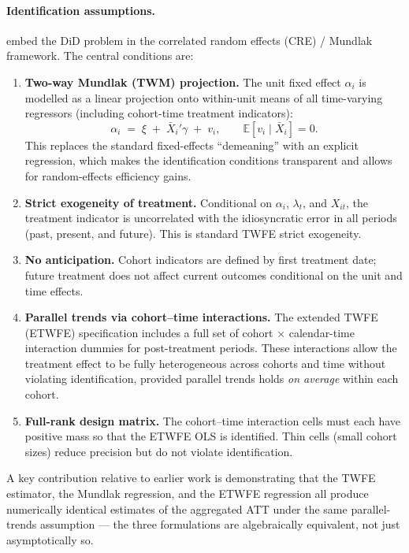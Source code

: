 \documentclass[12pt]{article}
\begin{document}
\paragraph{Identification assumptions.}
\citet{wooldridge2025twoway} embed the DiD problem in the correlated random
effects (CRE) / Mundlak framework.
The central conditions are:
\begin{enumerate}
  \item \textbf{Two-way Mundlak (TWM) projection.}
        The unit fixed effect $\alpha_i$ is modelled as a linear projection
        onto within-unit means of all time-varying regressors
        (including cohort-time treatment indicators):
        \[
          \alpha_i \;=\; \xi \;+\; \bar{X}_i'\gamma \;+\; v_i,
          \qquad \mathbb{E}[v_i \mid \bar{X}_i] = 0.
        \]
        This replaces the standard fixed-effects ``demeaning'' with an
        explicit regression, which makes the identification conditions
        transparent and allows for random-effects efficiency gains.

  \item \textbf{Strict exogeneity of treatment.}
        Conditional on $\alpha_i$, $\lambda_t$, and $X_{it}$, the treatment
        indicator is uncorrelated with the idiosyncratic error in all periods
        (past, present, and future).
        This is standard TWFE strict exogeneity.

  \item \textbf{No anticipation.}
        Cohort indicators are defined by first treatment date; future treatment
        does not affect current outcomes conditional on the unit and time effects.

  \item \textbf{Parallel trends via cohort--time interactions.}
        The extended TWFE (ETWFE) specification includes a full set of
        cohort $\times$ calendar-time interaction dummies for post-treatment
        periods.
        These interactions allow the treatment effect to be fully heterogeneous
        across cohorts and time without violating identification, provided
        parallel trends holds \textit{on average} within each cohort.

  \item \textbf{Full-rank design matrix.}
        The cohort--time interaction cells must each have positive mass so
        that the ETWFE OLS is identified.
        Thin cells (small cohort sizes) reduce precision but do not violate
        identification.
\end{enumerate}
A key contribution relative to earlier work is demonstrating that the TWFE
estimator, the Mundlak regression, and the ETWFE regression all produce
numerically identical estimates of the aggregated ATT under the same
parallel-trends assumption --- the three formulations are algebraically
equivalent, not just asymptotically so.
\end{document}
